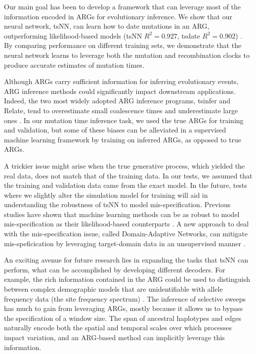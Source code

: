 Our main goal has been to develop a framework that can leverage most of the information encoded in ARGs for evolutionary inference.
We show that our neural network, tsNN, can learn how to date mutations in an ARG,
outperforming likelihood-based models (tsNN $R^2=0.927$, tsdate $R^2=0.902$) \citep{wohns_unified_2022}.
By comparing performance on different training sets,
we demonstrate that the neural network learns to leverage both the mutation and recombination clocks to produce accurate estimates of mutation times.

Although ARGs carry sufficient information for inferring evolutionary events,
ARG inference methods could significantly impact downstream applications.
Indeed, the two most widely adopted ARG inference programs, tsinfer and Relate, tend to overestimate small coalescence times and underestimate large ones \citep{y_c_brandt_evaluation_2022}.
In our mutation time inference task, we used the true ARGs for training and validation,
but some of these biases can be alleviated in a supervised machine learning framework by training on inferred ARGs, as opposed to true ARGs.

A trickier issue might arise when the true generative process, which yielded the real data, does not match that of the training data.
In our tests, we assumed that the training and validation data came from the exact model.
In the future, tests where we slightly alter the simulation model for training will aid in understanding the robustness of tsNN to model mis-specification.
Previous studies have shown that machine learning methods can be as robust to model mis-specification as their likelihood-based counterparts \citep{hejase_deep-learning_2022}.
A new approach to deal with the mis-specification issue, called Domain-Adaptive Networks, can mitigate mis-speficication by leveraging target-domain data in an unsupervised manner \citep{mo_domain-adaptive_2023}.

An exciting avenue for future research lies in expanding the tasks that tsNN can perform, 
what can be accomplished by developing different decoders.
For example, the rich information contained in the ARG could be used to distinguish between complex demographic models that are unidentifiable with allele frequency data (\eg the site frequency spectrum) \citep{schraiber_methods_2015, fan_likelihood-based_2023}.
The inference of selective sweeps has much to gain from leveraging ARGs,
mostly because it allows us to bypass the specification of a window size.
The span of ancestral haplotypes and edges naturally encode both the spatial and temporal scales over which processes impact variation,
and an ARG-based method can implicitly leverage this information.

